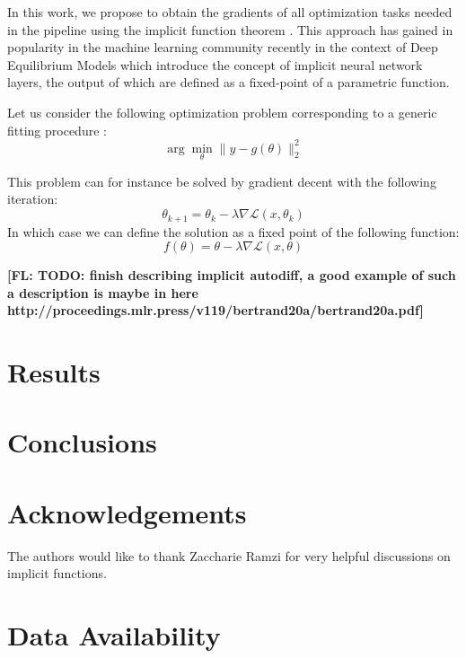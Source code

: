 \documentclass[fleqn,usenatbib]{mnras}
\newcommand{\FL}[1]{{\bf \color{blue} [FL: #1]}}
\begin{document}
In this work, we propose to obtain the gradients of all optimization tasks needed in the pipeline using the implicit function theorem \citep{Kranz2002}. This approach has gained in popularity in the machine learning community recently in the context of Deep Equilibrium Models which introduce the concept of implicit neural network layers, the output of which are defined as a fixed-point of a parametric function.

Let us consider the following optimization problem corresponding to a generic fitting procedure :
\begin{equation}
	\arg \min_{\theta} \parallel y - g(\theta) \parallel_2^2 
\end{equation}

This problem can for instance be solved by gradient decent with the following iteration:
\begin{equation}
	\theta_{k+1} = \theta_{k} - \lambda \nabla \mathcal{L}(x, \theta_k)
\end{equation}
In which case we can define the solution as a fixed point of the following function:
\begin{equation}
	f(\theta) = \theta -  \lambda \nabla \mathcal{L}(x, \theta)
\end{equation}

\FL{TODO: finish describing implicit autodiff, a good example of such a description is maybe in here http://proceedings.mlr.press/v119/bertrand20a/bertrand20a.pdf}


\section{Results}

\section{Conclusions}

\section*{Acknowledgements}

The authors would like to thank Zaccharie Ramzi for very helpful discussions on
implicit functions. 


\section*{Data Availability}
\end{document}
